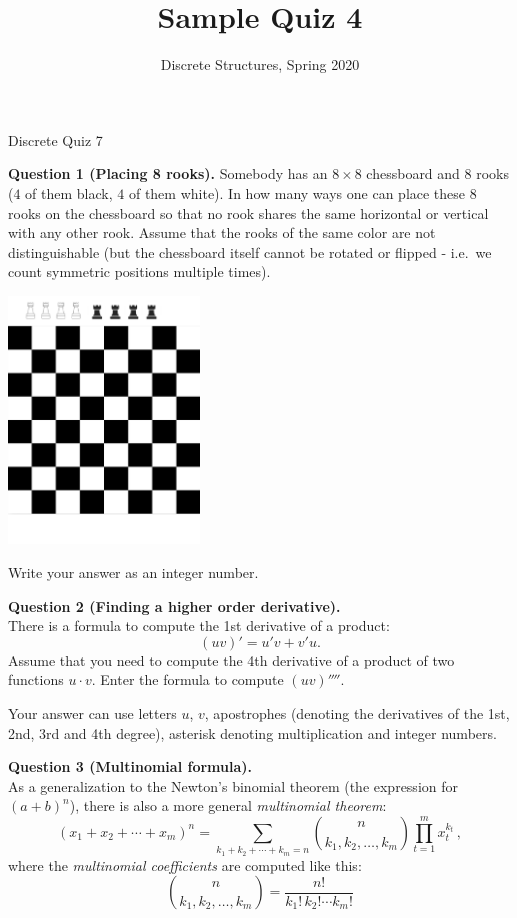 \documentclass[jou]{apa6}
\title{Sample Quiz 4}
\author{Discrete Structures, Spring 2020}
\affiliation{RBS}
\begin{document}
\thispagestyle{empty}

\twocolumn
{\Large Discrete Quiz 7}


\vspace{10pt}
{\bf Question 1 (Placing 8 rooks).} Somebody has an $8 \times 8$ chessboard and 
$8$ rooks ($4$ of them black, $4$ of them white). 
In how many ways one can place these $8$ rooks on the chessboard so that 
no rook shares the same horizontal or vertical with any other rook. 
Assume that the rooks of the same color are not distinguishable (but the chessboard itself cannot be rotated 
or flipped - i.e.\ we count symmetric positions multiple times).
\begin{center}
\includegraphics[width=2in]{quiz7/chessboard.png}
\end{center}

Write your answer as an integer number. 



\vspace{6pt}
{\bf Question 2 (Finding a higher order derivative).}\\
There is a formula to compute the 1st derivative of a product: 
$$(uv)' = u'v + v'u.$$
Assume that you need to compute the 4th derivative of a product of two functions $u\cdot v$. 
Enter the formula to compute $(uv)''''$. 

Your answer can use letters $u$, $v$, 
apostrophes (denoting the derivatives of the 1st, 2nd, 3rd and 4th degree), 
asterisk {\tt *} denoting multiplication and integer numbers. 


\vspace{6pt}
{\bf Question 3 (Multinomial formula).}\\
As a generalization to the Newton's binomial theorem (the expression for $(a+b)^n$), there
is also a more general {\em multinomial theorem}: 
$$(x_1 + x_2  + \cdots + x_m)^n
 = \sum\limits_{k_1+k_2+\cdots+k_m=n} {n \choose k_1, k_2, \ldots, k_m}
  \prod_{t=1}^m x_t^{k_t}\,,$$
where the {\em multinomial coefficients} are computed like this:
$${n \choose k_1, k_2, \ldots, k_m}
 = \frac{n!}{k_1!\, k_2! \cdots k_m!}$$
\end{document}
